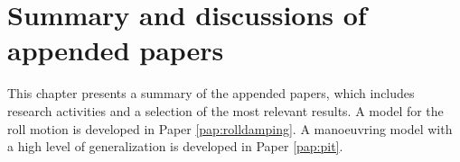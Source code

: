 \chapter{Summary and discussions of appended papers \label{ch:results}}
This chapter presents a summary of the appended papers, which includes research activities and a selection of the most relevant results. A model for the roll motion is developed in Paper \ref{pap:rolldamping}. A manoeuvring model with a high level of generalization is developed in Paper \ref{pap:pit}.



%





